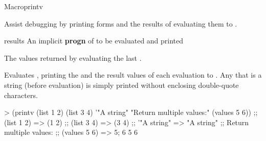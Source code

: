 \documentclass[10pt,twoside,english,pdftex]{article}
\begin{document}
\begin{functiondoc}{Macro}{printv}{\superstar{} 
    \returns{} \superstar}
% 

\fnsyntax

\fnpurpose Assist debugging by printing forms and the results of
evaluating them to .

\fnpackage {}

\fnmodule {}

\fnargs
\begin{args}{results}
\arg[forms] An implicit \textbf{progn} of  to be
evaluated and printed  
\end{args}

\fnreturns The values returned by evaluating the last .

\fndescription Evaluates , printing the  and the
result values of each evaluation to .  Any 
that is a string (before evaluation) is simply printed without enclosing
double-quote characters.

\fnexample 
\begin{example}
> (printv (list 1 2) (list 3 4) '"A string" 
          "Return multiple values:" (values 5 6))
;;  (list 1 2) => (1 2)
;;  (list 3 4) => (3 4)
;;  '"A string" => "A string"
;; Return multiple values:
;;  (values 5 6) => 5; 6
5
6
\end{example}

\end{functiondoc}

\end{document}
